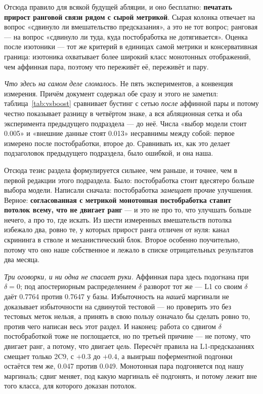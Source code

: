 Отсюда правило для всякой будущей абляции, и оно бесплатно: \textbf{печатать прирост ранговой
связи рядом с сырой метрикой}. Сырая колонка отвечает на вопрос «сдвинуло ли вмешательство
предсказания», а это не тот вопрос; ранговая --- на вопрос «сдвинуло ли туда, куда
постобработка не дотягивается». Оценка после изотоники --- тот же критерий в единицах самой
метрики и консервативная граница: изотоника охватывает более широкий класс монотонных
отображений, чем аффинная пара, поэтому что переживёт её, переживёт и пару.

\emph{Что здесь на самом деле сломалось.} Не пять экспериментов, а конвенция измерения.
Причём документ содержал обе сразу и этого не заметил: таблица~\ref{tab:vsboost} сравнивает
бустинг с сетью \emph{после} аффинной пары и потому честно показывает разницу в четвёртом
знаке, а вся абляционная сетка и оба эксперимента предыдущего подраздела --- до неё. Числа
«выбор модели стоит 0.005» и «внешние данные стоят 0.013» несравнимы между собой: первое
измерено после постобработки, второе до. Сравнивать их, как это делает подзаголовок
предыдущего подраздела, было ошибкой, и она наша.

Отсюда тезис раздела формулируется сильнее, чем раньше, и точнее, чем в первой редакции этого
подраздела. Было: постобработка стоит вдесятеро больше выбора модели. Написали сначала:
постобработка \emph{замещает} прочие улучшения. Верное: \textbf{согласованная с метрикой
монотонная постобработка ставит потолок всему, что не двигает ранг} --- и это не про то, что
улучшать больше нечего, а про то, где искать. Из шести измеренных вмешательств потолка
избежало два, ровно те, у которых прирост ранга отличен от нуля: канал скрининга в стволе и
механистический блок. Второе особенно поучительно, потому что оно наше собственное и лежало
в списке отрицательных результатов два месяца.

\emph{Три оговорки, и ни одна не спасает руки.} Аффинная пара здесь подогнана при
$\delta = 0$; под апостериорным распределением $\delta$ разворот тот же --- L1 со своим
$\delta$ даёт 0.7764 против 0.7647 у базы. Избыточность на \emph{нашей} маргинали не
доказывает избыточности на сдвинутой тестовой --- но проверить это без тестовых меток нельзя,
а принять в свою пользу означало бы сделать ровно то, против чего написан весь этот раздел.
И наконец: работа со сдвигом $\delta$ постобработкой тоже не поглощается, но по третьей
причине --- не потому, что двигает ранг, а потому, что двигает \emph{цель}. Пересчёт правила
на L1-предсказаниях смещает только 2C9, с $+0.3$ до $+0.4$, а выигрыш поферментной подгонки
остаётся тем же, 0.047 против 0.049. Монотонная пара подгоняется под нашу маргиналь; сдвиг
меняет, под какую маргиналь её подгонять, и потому лежит вне того класса, для которого
доказан потолок.

